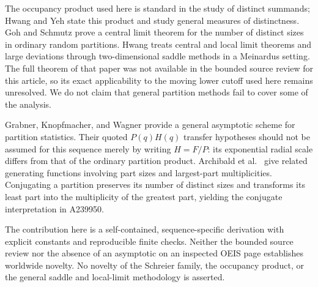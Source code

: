 \documentclass[11pt,letterpaper]{article}
\numberwithin{equation}{section}
\theoremstyle{definition}\newtheorem{definition}[theorem]{Definition}
\theoremstyle{remark}\newtheorem{remark}[theorem]{Remark}
\begin{document}
The occupancy product used here is standard in the study of distinct summands; Hwang and Yeh \cite{hwang-yeh} state this product and study general measures of distinctness. Goh and Schmutz \cite{goh-schmutz} prove a central limit theorem for the number of distinct sizes in ordinary random partitions. Hwang \cite{hwang} treats central and local limit theorems and large deviations through two-dimensional saddle methods in a Meinardus setting. The full theorem of that paper was not available in the bounded source review for this article, so its exact applicability to the moving lower cutoff used here remains unresolved. We do not claim that general partition methods fail to cover some of the analysis.

Grabner, Knopfmacher, and Wagner \cite{grabner} provide a general asymptotic scheme for partition statistics. Their quoted $P(q)H(q)$ transfer hypotheses should not be assumed for this sequence merely by writing $H=F/P$: its exponential radial scale differs from that of the ordinary partition product. Archibald et al.\ \cite{archibald} give related generating functions involving part sizes and largest-part multiplicities. Conjugating a partition preserves its number of distinct sizes and transforms its least part into the multiplicity of the greatest part, yielding the conjugate interpretation in A239950.

The contribution here is a self-contained, sequence-specific derivation with explicit constants and reproducible finite checks. Neither the bounded source review nor the absence of an asymptotic on an inspected OEIS page establishes worldwide novelty. No novelty of the Schreier family, the occupancy product, or the general saddle and local-limit methodology is asserted.
\end{document}
